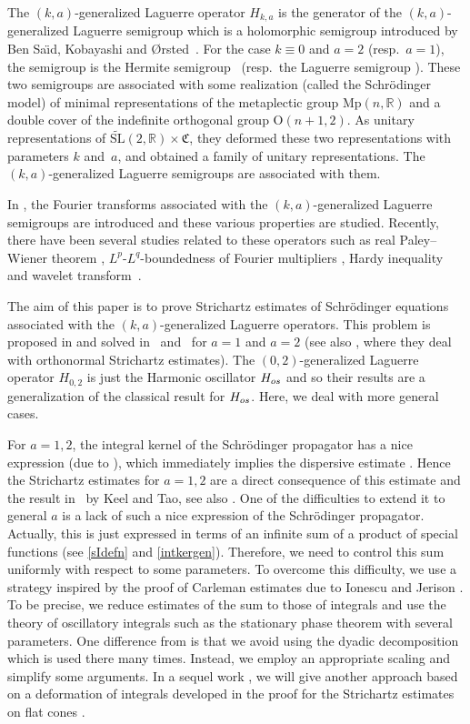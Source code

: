 \documentclass[10pt,a4paper]{article}
\numberwithin{equation}{section}
\def\R{\mathbb{R}}%
\def\SL{\mathrm{SL}}
\begin{document}
The $(k,a)$-generalized Laguerre operator $H_{k,a}$ is the generator of the $(k,a)$-generalized Laguerre semigroup which is a holomorphic semigroup introduced by Ben Sa\"{\i}d, Kobayashi and {\O}rsted~\cite{BKO}.
For the case $k\equiv 0$ and $a=2$ (resp.\ $a=1$), the semigroup is the Hermite semigroup~\cite{Fol, H} (resp.\ the Laguerre semigroup \cite{KM1, KM, KM2}).
These two semigroups are associated with some realization (called the Schr\"odinger model) of minimal representations of the metaplectic group $\mathrm{Mp}(n,\R)$ and a double cover of the indefinite orthogonal group $\mathrm{O}(n+1,2)$.
As unitary representations of $\widetilde{\SL}(2,\R)\times\mathfrak{C}$, they deformed these two representations with parameters $k$ and~$a$, and obtained a family of unitary representations.
The $(k,a)$-generalized Laguerre semigroups are associated with them.

In \cite{BKO}, the Fourier transforms associated with the $(k,a)$-generalized Laguerre semigroups are introduced and these various properties are studied. Recently, there have been several studies related to these operators such as real Paley--Wiener theorem \cite{LLF}, $L^p$-$L^q$-boundedness of Fourier multipliers \cite{KR}, Hardy inequality \cite{Te} and wavelet transform~\cite{BMMS}.

The aim of this paper is to prove Strichartz estimates of Schr\"odinger equations associated with the $(k,a)$-generalized Laguerre operators. This problem is proposed in \cite{BKO} and solved in~\cite{B} and~\cite{M} for $a=1$ and $a=2$ (see also \cite{MS}, where they deal with orthonormal Strichartz estimates). The $(0,2)$-generalized Laguerre operator $H_{0,2}$ is just the Harmonic oscillator $H_{\rm os}$ and so their results are a generalization of the classical result for $H_{\rm os}$. Here, we deal with more general cases.

For $a=1,2$, the integral kernel of the Schr\"odinger propagator has a nice expression (due to \cite[formula~(4.58)]{BKO}), which immediately implies the dispersive estimate \cite[Proposition 4.26]{BKO}. Hence the Strichartz estimates for $a=1,2$ are a direct consequence of this estimate and the result in~\cite{KT} by Keel and Tao, see also \cite{B,MS}. One of the difficulties to extend it to general $a$ is a lack of such a nice expression of the Schr\"odinger propagator. Actually, this is just expressed in terms of an infinite sum of a product of special functions (see \eqref{sIdefn} and \eqref{intkergen}). Therefore, we need to control this sum uniformly with respect to some parameters.
To overcome this difficulty, we use a strategy inspired by the proof of Carleman estimates due to Ionescu and Jerison \cite{IJ}. To be precise, we reduce estimates of the sum to those of integrals and use the theory of oscillatory integrals such as the stationary phase theorem with several parameters. One difference from \cite{IJ} is that we avoid using the dyadic decomposition which is used there many times. Instead, we employ an appropriate scaling and simplify some arguments.
In a sequel work \cite{TT}, we will give another approach based on a deformation of integrals developed in the proof for the Strichartz estimates on flat cones \cite{F}.
\end{document}
